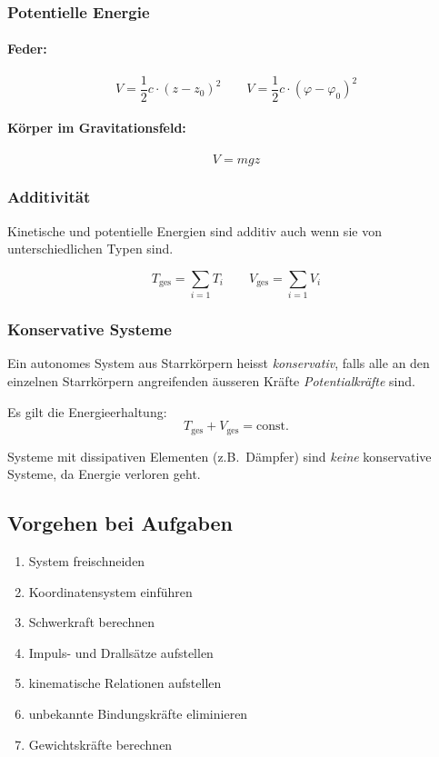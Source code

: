 \documentclass[9pt,fleqn,ngerman,article]{memoir}
\begin{document}
\begin{multicols*}{3}
				\subsubsection{Potentielle Energie} %
					\paragraph{Feder:} %
						\[
							V = \frac{1}{2} c \cdot (z - z_0)^2 \qquad V = \frac{1}{2} c \cdot (\varphi - \varphi_0)^2
						\]
					
					\paragraph{Körper im Gravitationsfeld:} %
						\[
							V = mgz
						\]
				
				\subsubsection{Additivität} %
					Kinetische und potentielle Energien sind additiv auch wenn sie von unterschiedlichen Typen sind.
					
					\[
						T_{\text{ges}} = \sum_{i=1} T_i
						 \qquad V_{\text{ges}} = \sum_{i=1} V_i
					\]
				
				\subsubsection{Konservative Systeme} %
					Ein autonomes System aus Starrkörpern heisst \emph{konservativ}, falls alle an den einzelnen Starrkörpern angreifenden äusseren Kräfte \emph{Potentialkräfte} sind.
					
					Es gilt die Energieerhaltung:
					\[
						T_{\text{ges}} + V_{\text{ges}} = \text{const}.
					\]
					
					Systeme mit dissipativen Elementen (z.B.~Dämpfer) sind \emph{keine} konservative Systeme, da Energie verloren geht.
				
			
			\subsection{Vorgehen bei Aufgaben} %
				\begin{enumerate}
					\item System freischneiden
					\item Koordinatensystem einführen
					\item Schwerkraft berechnen
					\item Impuls- und Drallsätze aufstellen
					\item kinematische Relationen aufstellen
					\item unbekannte Bindungskräfte eliminieren
					\item Gewichtskräfte berechnen
				\end{enumerate}

\end{multicols*}
\end{document}
